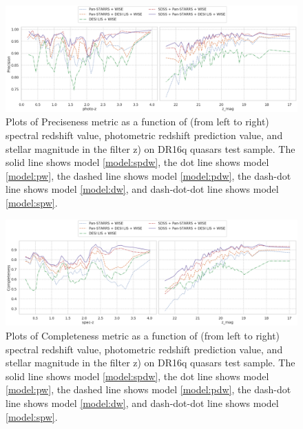\documentclass[fleqn,usenatbib]{mnras}
\begin{document}
\begin{figure}
    \centering
    \includegraphics[width=0.9\linewidth]{images/metrics-prec-dr16q.png}
    \caption{Plots of Preciseness metric as a function of (from left to right) spectral redshift value, photometric redshift prediction value, and stellar magnitude in the filter z) on DR16q quasars test sample. The solid line shows model \ref{model:spdw}, the dot line shows model \ref{model:pw}, the dashed line shows model \ref{model:pdw}, the dash-dot line shows model \ref{model:dw}, and dash-dot-dot line shows model \ref{model:spw}.}
    \label{fig:metrics-prec-dr16q}
\end{figure}

\begin{figure}
    \centering
    \includegraphics[width=0.9\linewidth]{images/metrics-comp-dr16q.png}
    \caption{Plots of Completeness metric as a function of (from left to right) spectral redshift value, photometric redshift prediction value, and stellar magnitude in the filter z) on DR16q quasars test sample. The solid line shows model \ref{model:spdw}, the dot line shows model \ref{model:pw}, the dashed line shows model \ref{model:pdw}, the dash-dot line shows model \ref{model:dw}, and dash-dot-dot line shows model \ref{model:spw}.}
    \label{fig:metrics-comp-dr16q}
\end{figure}
\end{document}
